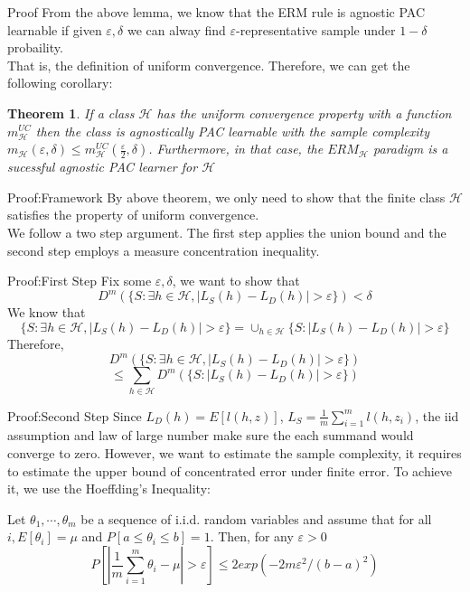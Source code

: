 \documentclass{beamer}
\newtheorem{thm}{Theorem}[subsection]
\begin{document}
\begin{frame}{Proof}
	From the above lemma, we know that the ERM rule is agnostic PAC learnable if given $\varepsilon,\delta$ we can alway find $\varepsilon$-representative sample under $1-\delta$ probaility.  \\
	That is, the definition of uniform convergence. Therefore, we can get the following corollary:
	\begin{thm}
		If a class $\mathcal{H}$ has the uniform convergence property with a function $m_{\mathcal{H}}^{UC}$ then the class is agnostically PAC learnable with the sample complexity $m_{\mathcal{H}} (\varepsilon,\delta) \leq m_{\mathcal{H}}^{UC}(\frac{\varepsilon}{2},\delta)$. Furthermore, in that case, the $ERM_{\mathcal{H}}$ paradigm is a sucessful agnostic PAC learner for $\mathcal{H}$
	\end{thm}
\end{frame}
\begin{frame}{Proof:Framework}
	By above theorem, we only need to show that the finite class $\mathcal{H}$ satisfies the property of uniform convergence. \\
	We follow a two step argument. The first step applies the union bound and the second step employs a measure concentration inequality.
\end{frame}
\begin{frame}{Proof:First Step}
	Fix some $\varepsilon,\delta$, we want to show that 
	\[D^{m}(\{S: \exists h \in \mathcal{H}, |L_S(h) - L_D(h)| > \varepsilon\}) < \delta\]
	We know that
	\[\{S: \exists h \in \mathcal{H}, |L_S(h) - L_D(h)| > \varepsilon\} =\cup_{h \in \mathcal{H}} \{S: |L_S(h) - L_D(h)| > \varepsilon\}\]
	Therefore,
	\[D^{m}(\{S: \exists h \in \mathcal{H}, |L_S(h) - L_D(h)| > \varepsilon\})\]
	\[\leq \sum_{h \in \mathcal{H}} D^m(\{S:|L_S(h) - L_D(h)| > \varepsilon\})\]
\end{frame}
\begin{frame}{Proof:Second Step}
	Since $L_D(h) = E[l(h,z)]$, $L_S = \frac{1}{m} \sum^m_{i=1} l(h,z_i)$, the iid assumption and law of large number make sure the each summand would converge to zero. However, we want to estimate the sample complexity, it requires to estimate the upper bound of concentrated error under finite error. To achieve it, we use the Hoeffding's Inequality:
	\begin{lemma}
		Let $\theta_1, \cdots , \theta_m$ be a sequence of i.i.d. random variables and assume that for all $i, E[\theta_i] = \mu$ and $P[a\leq \theta_i \leq b]=1$. Then, for any $\varepsilon >0$
		\[P[|\frac{1}{m} \sum^m_{i=1} \theta_i - \mu| > \varepsilon] \leq 2 exp(-2 m \varepsilon^2/(b-a)^2)\]
	\end{lemma}
\end{frame}
\end{document}
